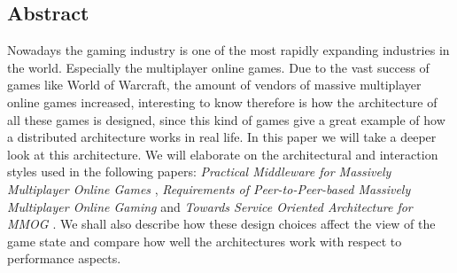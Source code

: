 \begin{center}
\section*{Abstract}
\end{center}
Nowadays the gaming industry is one of the most rapidly expanding industries in the world. Especially the multiplayer online games. Due to the vast success of games like World of Warcraft, the amount of vendors of massive multiplayer online games increased, interesting to know therefore is how the architecture of all these games is designed, since this kind of games give a great example of how a distributed architecture works in real life. In this paper we will take a deeper look at this architecture. We will elaborate on the architectural and interaction styles used in the following papers: \emph{Practical Middleware for Massively Multiplayer Online Games} \cite{middleware}, \emph{Requirements of Peer-to-Peer-based Massively Multiplayer Online Gaming} \cite{peer} and \emph{Towards Service Oriented Architecture for MMOG} \cite{service}. We shall also describe how these design choices affect the view of the game state and compare how well the architectures work with respect to performance aspects.\\
